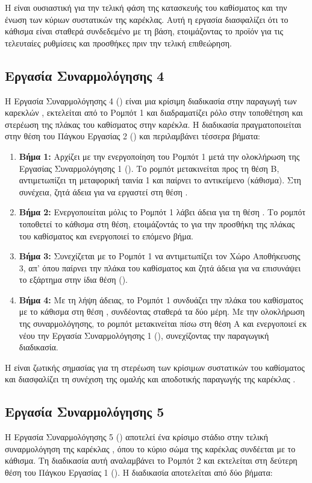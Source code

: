 Η  είναι ουσιαστική για την τελική φάση της κατασκευής του καθίσματος και την ένωση των κύριων συστατικών της καρέκλας. Αυτή η εργασία διασφαλίζει ότι το κάθισμα είναι σταθερά συνδεδεμένο με τη βάση, ετοιμάζοντας το προϊόν για τις τελευταίες ρυθμίσεις και προσθήκες πριν την τελική επιθεώρηση.

\subsection{Εργασία Συναρμολόγησης 4}
\noindent Η Εργασία Συναρμολόγησης 4 () είναι μια κρίσιμη διαδικασία στην παραγωγή των καρεκλών , εκτελείται από το Ρομπότ 1 και διαδραματίζει ρόλο στην τοποθέτηση και στερέωση της πλάκας του καθίσματος στην καρέκλα. Η διαδικασία πραγματοποιείται στην θέση του Πάγκου Εργασίας 2 () και περιλαμβάνει τέσσερα βήματα:

\begin{enumerate}
    \item \textbf{Βήμα 1:} Αρχίζει με την ενεργοποίηση του Ρομπότ 1 μετά την ολοκλήρωση της Εργασίας Συναρμολόγησης 1 (). Το ρομπότ μετακινείται προς τη θέση Β, αντιμετωπίζει τη μεταφορική ταινία 1 και παίρνει το αντικείμενο (κάθισμα). Στη συνέχεια, ζητά άδεια για να εργαστεί στη θέση .
    \item \textbf{Βήμα 2:} Ενεργοποιείται μόλις το Ρομπότ 1 λάβει άδεια για τη θέση . Το ρομπότ τοποθετεί το κάθισμα στη θέση, ετοιμάζοντάς το για την προσθήκη της πλάκας του καθίσματος και ενεργοποιεί το επόμενο βήμα.
    \item \textbf{Βήμα 3:} Συνεχίζεται με το Ρομπότ 1 να αντιμετωπίζει τον Χώρο Αποθήκευσης 3, απ' όπου παίρνει την πλάκα του καθίσματος και ζητά άδεια για να επισυνάψει το εξάρτημα στην ίδια θέση ().
    \item \textbf{Βήμα 4:} Με τη λήψη άδειας, το Ρομπότ 1 συνδυάζει την πλάκα του καθίσματος με το κάθισμα στη θέση , συνδέοντας σταθερά τα δύο μέρη. Με την ολοκλήρωση της συναρμολόγησης, το ρομπότ μετακινείται πίσω στη θέση Α και ενεργοποιεί εκ νέου την Εργασία Συναρμολόγησης 1 (), συνεχίζοντας την παραγωγική διαδικασία.
\end{enumerate}

Η  είναι ζωτικής σημασίας για τη στερέωση των κρίσιμων συστατικών του καθίσματος και διασφαλίζει τη συνέχιση της ομαλής και αποδοτικής παραγωγής της καρέκλας .

\subsection{Εργασία Συναρμολόγησης 5}
\noindent Η Εργασία Συναρμολόγησης 5 () αποτελεί ένα κρίσιμο στάδιο στην τελική συναρμολόγηση της καρέκλας , όπου το κύριο σώμα της καρέκλας συνδέεται με το κάθισμα. Τη διαδικασία αυτή αναλαμβάνει το Ρομπότ 2 και εκτελείται στη δεύτερη θέση του Πάγκου Εργασίας 1 (). Η διαδικασία  αποτελείται από δύο βήματα:

